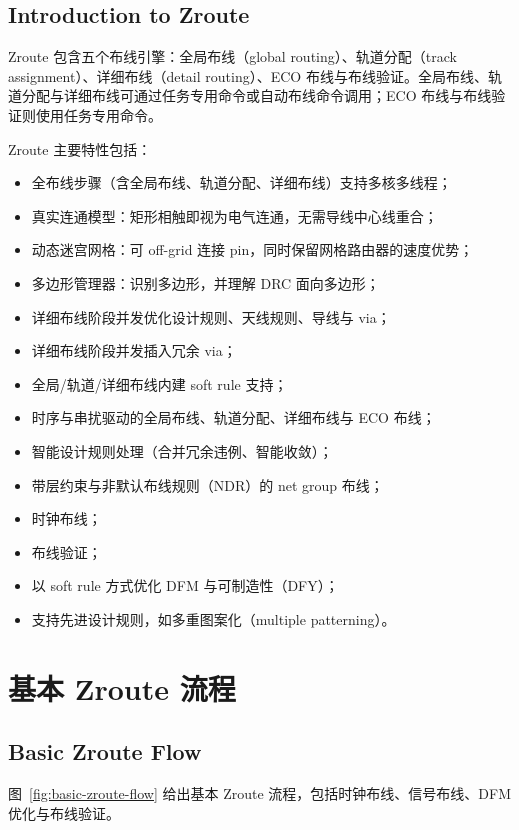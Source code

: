 \subsection*{Introduction to Zroute}

Zroute 包含五个布线引擎：全局布线（global routing）、轨道分配（track assignment）、详细布线（detail routing）、ECO 布线与布线验证。全局布线、轨道分配与详细布线可通过任务专用命令或自动布线命令调用；ECO 布线与布线验证则使用任务专用命令。

Zroute 主要特性包括：
\begin{itemize}
  \item 全布线步骤（含全局布线、轨道分配、详细布线）支持多核多线程；
  \item 真实连通模型：矩形相触即视为电气连通，无需导线中心线重合；
  \item 动态迷宫网格：可 off-grid 连接 pin，同时保留网格路由器的速度优势；
  \item 多边形管理器：识别多边形，并理解 DRC 面向多边形；
  \item 详细布线阶段并发优化设计规则、天线规则、导线与 via；
  \item 详细布线阶段并发插入冗余 via；
  \item 全局/轨道/详细布线内建 soft rule 支持；
  \item 时序与串扰驱动的全局布线、轨道分配、详细布线与 ECO 布线；
  \item 智能设计规则处理（合并冗余违例、智能收敛）；
  \item 带层约束与非默认布线规则（NDR）的 net group 布线；
  \item 时钟布线；
  \item 布线验证；
  \item 以 soft rule 方式优化 DFM 与可制造性（DFY）；
  \item 支持先进设计规则，如多重图案化（multiple patterning）。
\end{itemize}

\section{基本 Zroute 流程}
\subsection*{Basic Zroute Flow}

图~\ref{fig:basic-zroute-flow} 给出基本 Zroute 流程，包括时钟布线、信号布线、DFM 优化与布线验证。

